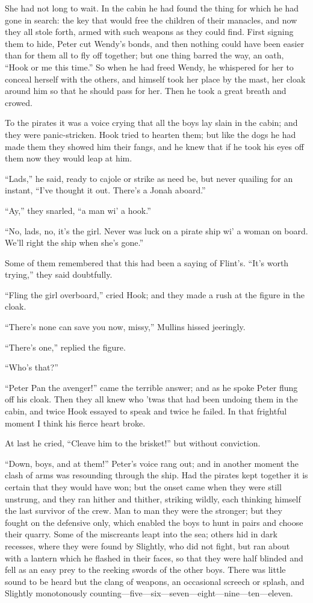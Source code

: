 She had not long to wait. In the cabin he had found the thing for which
he had gone in search: the key that would free the children of their
manacles, and now they all stole forth, armed with such weapons as they
could find. First signing them to hide, Peter cut Wendy's bonds, and
then nothing could have been easier than for them all to fly off
together; but one thing barred the way, an oath, ``Hook or me this
time.'' So when he had freed Wendy, he whispered for her to conceal
herself with the others, and himself took her place by the mast, her
cloak around him so that he should pass for her. Then he took a great
breath and crowed.

To the pirates it was a voice crying that all the boys lay slain in the
cabin; and they were panic-stricken. Hook tried to hearten them; but
like the dogs he had made them they showed him their fangs, and he knew
that if he took his eyes off them now they would leap at him.

``Lads,'' he said, ready to cajole or strike as need be, but never
quailing for an instant, ``I've thought it out. There's a Jonah aboard.''

``Ay,'' they snarled, ``a man wi' a hook.''

``No, lads, no, it's the girl. Never was luck on a pirate ship wi' a
woman on board. We'll right the ship when she's gone.''

Some of them remembered that this had been a saying of Flint's. ``It's
worth trying,'' they said doubtfully.

``Fling the girl overboard,'' cried Hook; and they made a rush at the
figure in the cloak.

``There's none can save you now, missy,'' Mullins hissed jeeringly.

``There's one,'' replied the figure.

``Who's that?''

``Peter Pan the avenger!'' came the terrible answer; and as he spoke
Peter flung off his cloak. Then they all knew who 'twas that had been
undoing them in the cabin, and twice Hook essayed to speak and twice he
failed. In that frightful moment I think his fierce heart broke.

At last he cried, ``Cleave him to the brisket!'' but without conviction.

``Down, boys, and at them!'' Peter's voice rang out; and in another
moment the clash of arms was resounding through the ship. Had the
pirates kept together it is certain that they would have won; but the
onset came when they were still unstrung, and they ran hither and
thither, striking wildly, each thinking himself the last survivor of
the crew. Man to man they were the stronger; but they fought on the
defensive only, which enabled the boys to hunt in pairs and choose
their quarry. Some of the miscreants leapt into the sea; others hid in
dark recesses, where they were found by Slightly, who did not fight,
but ran about with a lantern which he flashed in their faces, so that
they were half blinded and fell as an easy prey to the reeking swords
of the other boys. There was little sound to be heard but the clang of
weapons, an occasional screech or splash, and Slightly monotonously
counting---five—six—seven—eight—nine—ten—eleven.

